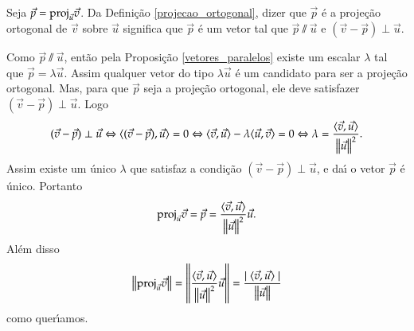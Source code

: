 \begin{prova}
  Seja $\vec{p} = {\rm proj}_{\vec{u}}\vec{v}$. Da Defini\c{c}\~ao \ref{projecao_ortogonal}, dizer que $\vec{p}$ \'e a proje\c{c}\~ao ortogonal de $\vec{v}$ sobre $\vec{u}$ significa que $\vec{p}$ \'e um vetor tal que $\vec{p}\varparallel\vec{u}$ e $(\vec{v} - \vec{p})\perp\vec{u}$.

  Como $\vec{p}\varparallel\vec{u}$, ent\~ao pela Proposi\c{c}\~ao \ref{vetores_paralelos} existe um escalar $\lambda$ tal que $\vec{p} = \lambda\vec{u}$. Assim qualquer vetor do tipo $\lambda\vec{u}$ \'e um candidato para ser a proje\c{c}\~ao ortogonal. Mas, para que $\vec{p}$ seja a proje\c{c}\~ao ortogonal, ele deve satisfazer $(\vec{v} - \vec{p})\perp\vec{u}$. Logo
  \begin{align*}
    (\vec{v} - \vec{p})\perp\vec{u} \Leftrightarrow \langle(\vec{v} - \vec{p}), \vec{u}\rangle = 0 \Leftrightarrow \langle \vec{v}, \vec{u} \rangle - \lambda\langle \vec{u}, \vec{v} \rangle = 0 \Leftrightarrow \lambda = \dfrac{\langle \vec{v}, \vec{u} \rangle}{\left\Vert{\vec{u}}\right\Vert^2}.
  \end{align*}
  Assim existe um \'unico $\lambda$ que satisfaz a condi\c{c}\~ao $(\vec{v} - \vec{p})\perp\vec{u}$, e da{\'\i} o vetor $\vec{p}$ \'e \'unico. Portanto
  \[
    {\rm proj}_{\vec{u}}\vec{v} = \vec{p} = \dfrac{\langle \vec{v}, \vec{u} \rangle}{\left\Vert{\vec{u}}\right\Vert^2}\vec{u}.
  \]
  Al\'em disso
  \[
    \left\Vert{{\rm proj}_{\vec{u}}\vec{v}}\right\Vert = \left\Vert{\dfrac{\langle \vec{v}, \vec{u} \rangle}{\left\Vert{\vec{u}}\right\Vert^2}\vec{u}}\right\Vert = \dfrac{\mid\langle \vec{v}, \vec{u} \rangle\mid}{\left\Vert{\vec{u}}\right\Vert}
  \]
  como quer{\'\i}amos.
\end{prova}


